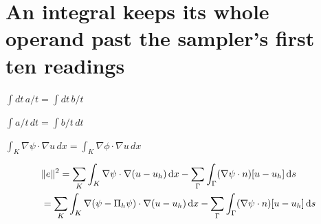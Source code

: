 \documentclass{article}
\def\d{{\rm d}}
\begin{document}
\section{An integral keeps its whole operand past the sampler's first ten readings}
$\int dt\,a/t=\int dt\,b/t$

$\int a/t\,dt=\int b/t\,dt$

$\int_K \nabla\psi\cdot\nabla u\,dx = \int_K \nabla\phi\cdot\nabla u\,dx$

\begin{equation}
\begin{split}
&\|e\|^2 = \sum_K\int_K \nabla\psi\cdot\nabla(u-u_h)\,\d x - \sum_\Gamma\int_\Gamma (\nabla\psi\cdot n)[u-u_h]\,\d s\\
&=\sum_K\int_K \nabla(\psi-\Pi_h\psi)\cdot\nabla(u-u_h)\,\d x - \sum_\Gamma\int_\Gamma (\nabla\psi\cdot n)[u-u_h]\,\d s
\end{split}
\end{equation}
\end{document}
